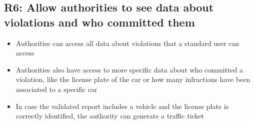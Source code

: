 \subsection{R6: Allow authorities to see data about violations and who committed them}
\begin{itemize}
    \item Authorities can access all data about violations that a standard user can access
    \item Authorities also have access to more specific data about who committed a violation, like the license plate of the car or how many infractions have been associated to a specific car
    \item In case the validated report includes a vehicle and the license plate is correctly identified, the authority can generate a traffic ticket
\end{itemize}
